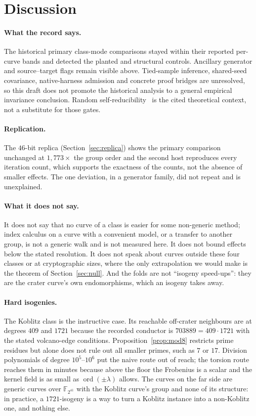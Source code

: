 \documentclass[10pt,a4paper]{article}
\theoremstyle{remark}
\newcommand{\FF}{\mathbb{F}}
\begin{document}
\section{Discussion}

\paragraph{What the record says.} The historical primary class-mode
comparisons stayed within their reported per-curve bands and detected the
planted and structural controls. Ancillary generator and source--target
flags remain visible above. Tied-sample inference, shared-seed covariance,
native-harness admission and concrete proof bridges are unresolved, so this
draft does not promote the historical analysis to a general empirical
invariance conclusion. Random self-reducibility~\cite{JaoMillerVenkatesan2005}
is the cited theoretical context, not a substitute for those gates.

\paragraph{Replication.} The $46$-bit replica (Section~\ref{sec:replica}) shows the
primary comparison unchanged at $1{,}773\times$ the group order and the second
host reproduces every iteration count, which supports the exactness of the
counts, not the absence of smaller effects. The one deviation, in a generator
family, did not repeat and is unexplained.

\paragraph{What it does not say.} It does not say that no curve of a class
is easier for some non-generic method; index calculus on a curve with a
convenient model, or a transfer to another group, is not a generic walk and
is not measured here. It does not bound effects below the stated resolution.
It does not speak about curves outside these four classes or at
cryptographic sizes, where the only extrapolation we would make is the
theorem of Section~\ref{sec:null}. And the folds are not ``isogeny
speed-ups'': they are the crater curve's own endomorphisms, which an isogeny
takes away.

\paragraph{Hard isogenies.} The Koblitz class is the instructive case. Its
reachable off-crater neighbours are at degrees $409$ and $1721$ because the
recorded conductor is $703889=409\cdot1721$ with the stated volcano-edge
conditions. Proposition~\ref{prop:mod8} restricts prime residues but alone
does not rule out all smaller primes, such as $7$ or $17$. Division polynomials of
degree $10^5$--$10^6$ put the naive route out of reach; the torsion route
reaches them in minutes because above the floor the Frobenius is a scalar and
the kernel field is as small as $\operatorname{ord}(\pm\lambda)$ allows. The
curves on the far side are generic curves over $\FF_{2^{41}}$ with the
Koblitz curve's group and none of its structure: in practice, a $1721$-isogeny
is a way to turn a Koblitz instance into a non-Koblitz one, and nothing else.
\end{document}
